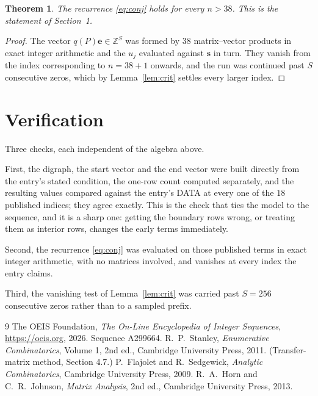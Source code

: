 \documentclass[11pt,a4paper]{article}
\theoremstyle{plain}
\newtheorem{theorem}{Theorem}
\theoremstyle{definition}
\begin{document}
\begin{theorem}
The recurrence \eqref{eq:conj} holds for every $n>38$. This is the statement of
Section~1.
\end{theorem}

\begin{proof}
The vector $q(P)\mathbf{e}\in\mathbb{Z}^{S}$ was formed by $38$ matrix--vector
products in exact integer arithmetic and the $u_j$ evaluated against $\mathbf{s}$ in turn.
They vanish from the index corresponding to $n=38+1$ onwards, and the run was continued
past $S$ consecutive zeros, which by Lemma~\ref{lem:crit} settles every larger index.
\end{proof}

\section{Verification}

Three checks, each independent of the algebra above.

First, the digraph, the start vector and the end vector were built directly from the
entry's stated condition, the one-row count computed separately, and the resulting values
compared against the entry's DATA at every one of the $18$ published indices; they
agree exactly. This is the check that ties the model to the sequence, and it is a sharp one:
getting the boundary rows wrong, or treating them as interior rows, changes the early terms
immediately.

Second, the recurrence \eqref{eq:conj} was evaluated on those published terms in exact
integer arithmetic, with no matrices involved, and vanishes at every index the entry claims.

Third, the vanishing test of Lemma~\ref{lem:crit} was carried past $S=256$ consecutive
zeros rather than to a sampled prefix.

\begin{thebibliography}{9}
 The OEIS Foundation, \emph{The On-Line Encyclopedia of Integer
Sequences}, \url{https://oeis.org}, 2026. Sequence A299664.
 R.~P.~Stanley, \emph{Enumerative Combinatorics}, Volume 1, 2nd ed.,
Cambridge University Press, 2011. (Transfer-matrix method, Section 4.7.)
 P.~Flajolet and R.~Sedgewick, \emph{Analytic Combinatorics}, Cambridge
University Press, 2009.
 R.~A.~Horn and C.~R.~Johnson, \emph{Matrix Analysis}, 2nd ed., Cambridge
University Press, 2013.
\end{thebibliography}
\end{document}
